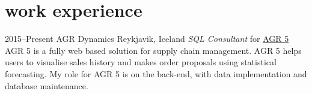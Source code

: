 \documentclass[]{cv} %
\begin{document}
\section{work experience}


\begin{entrylist}
\entry
{2015--Present}
{AGR Dynamics}
{Reykjavik, Iceland}
{\emph{SQL Consultant} for
    \href{http://agrdynamics.com/}{AGR 5}\\
    AGR 5 is a fully web based solution for supply chain management. AGR 5 
    helps users to visualise sales history and makes order proposals using 
    statistical forecasting. My role for AGR 5 is on the back-end, with data 
    implementation and database maintenance.
}    
\end{entrylist}
\end{document}
